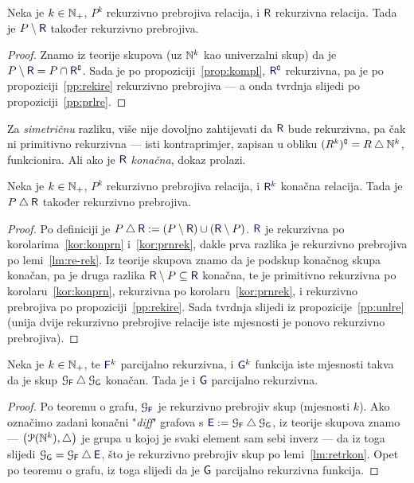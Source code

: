 \begin{lema}[{name=[rekurzivna prebrojivost razlike s rekurzivnom relacijom]}]\label{lm:re-rek}
Neka je $k\in{\mathbb N}_+$, $P^k$ rekurzivno prebrojiva relacija, i $\f R$ rekurzivna relacija. Tada je $P\setminus\f R$ također rekurzivno prebrojiva.
\end{lema}
\begin{proof}
Znamo iz teorije skupova (uz ${\mathbb N}^k$ kao univerzalni skup) da je $P\setminus\f R=P\cap\f R\kompl$. Sada je po propoziciji~\ref{prop:kompl}, $\f R\kompl$ rekurzivna, pa je po propoziciji~\ref{pp:rekire} rekurzivno prebrojiva --- a onda tvrdnja slijedi po propoziciji~\ref{pp:prlre}.
\end{proof}

Za \emph{simetričnu} razliku, više nije dovoljno zahtijevati da $\f R$ bude rekurzivna, pa čak ni primitivno rekurzivna --- isti kontraprimjer, zapisan u obliku $(R^k)\sp{{\scriptscriptstyle\complement}}=R\mathbin\triangle{\mathbb N}^k$, funkcionira. Ali ako je $\f R$ \emph{konačna}, dokaz prolazi.

\begin{lema}[{name=[rekurzivna prebrojivost simetrične razlike s konačnom relacijom]}]\label{lm:retrkon}
Neka je $k\in{\mathbb N}_+$, $P^k$ rekurzivno prebrojiva relacija, i $\f R^k$ konačna relacija. Tada je $P\mathbin\triangle\f R$ također rekurzivno prebrojiva.
\end{lema}
\begin{proof}
Po definiciji je $P\mathbin\triangle\f R:=(P\setminus\f R)\cup(\f R\setminus P)$. 
$\f R$ je rekurzivna po korolarima~\ref{kor:konprn} i~\ref{kor:prnrek}, dakle prva razlika je rekurzivno prebrojiva po lemi~\ref{lm:re-rek}. Iz teorije skupova znamo da je podskup konačnog skupa konačan, pa je druga razlika $\f R\setminus P\subseteq\f R$ konačna, te je primitivno rekurzivna po korolaru~\ref{kor:konprn}, rekurzivna po korolaru~\ref{kor:prnrek}, i rekurzivno prebrojiva po propoziciji~\ref{pp:rekire}. Sada tvrdnja slijedi iz propozicije~\ref{pp:unlre} (unija dvije rekurzivno prebrojive relacije iste mjesnosti je ponovo rekurzivno prebrojiva).
\end{proof}

\begin{propozicija}[{name=[teorem o editiranju za parcijalne funkcije]}]
Neka je $k\in{\mathbb N}_+$, te $\f F^k$ parcijalno rekurzivna, i $\f G^k$ funkcija iste mjesnosti takva da je skup $\graf{\f F}\mathbin\triangle\graf{\f G}$ konačan. Tada je i $\f G$ parcijalno rekurzivna.
\end{propozicija}
\begin{proof}
Po teoremu o grafu, $\graf{\f F}$ je rekurzivno prebrojiv skup (mjesnosti $k$). Ako označimo zadani konačni "\emph{\!diff}" grafova s $\f E:=\graf{\f F}\mathbin\triangle\graf{\f G}$, iz teorije skupova znamo --- $\bigl(\mathcal P({\mathbb N}^k),\mathbin\triangle\bigr)$ je grupa u kojoj je svaki element sam sebi inverz --- da iz toga slijedi $\graf{\f G}=\graf{\f F}\mathbin\triangle\f E$, što je rekurzivno prebrojiv skup po lemi~\ref{lm:retrkon}. Opet po teoremu o grafu, iz toga slijedi da je $\f G$ parcijalno rekurzivna funkcija.
\end{proof}

